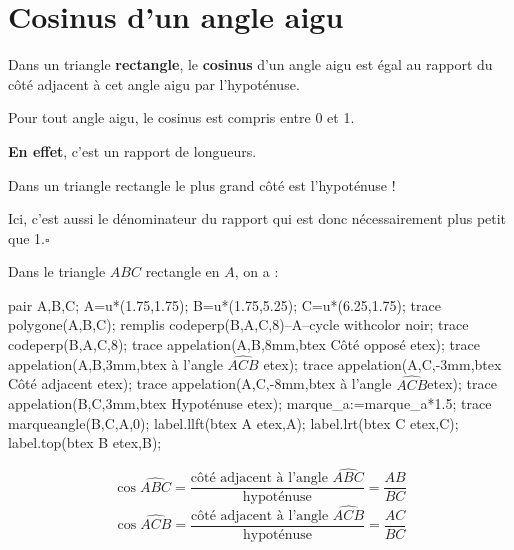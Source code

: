 \section{Cosinus d'un angle aigu}
\begin{definition}
    Dans un triangle {\bfseries rectangle}, le \textbf{cosinus} d'un angle aigu est égal au rapport du côté adjacent à cet angle aigu par l'hypoténuse.
\end{definition}

\begin{remarque}
    Pour tout angle aigu, le cosinus est compris entre 0 et 1.

    {\bfseries En effet}, c'est un rapport de longueurs.\par
    Dans un triangle rectangle le plus grand côté est l'hypoténuse !\par
    Ici, c'est aussi le dénominateur du rapport qui est donc nécessairement plus petit que 1.$\square$
\end{remarque}

\begin{exemples*1}
    Dans le triangle $ABC$ rectangle en $A$, on a : 
    
    \medskip
    \begin{minipage}{0.4\linewidth}
        \begin{Geometrie}[CoinHD={(7u,6u)}]            
            pair A,B,C;
            A=u*(1.75,1.75);
            B=u*(1.75,5.25);
            C=u*(6.25,1.75);
            trace polygone(A,B,C);
            remplis codeperp(B,A,C,8)--A--cycle withcolor noir;
            trace codeperp(B,A,C,8);
            trace appelation(A,B,8mm,btex Côté opposé etex);
            trace appelation(A,B,3mm,btex à l'angle $\widehat{ACB}$ etex);
            trace appelation(A,C,-3mm,btex Côté adjacent etex);
            trace appelation(A,C,-8mm,btex à l'angle $\widehat{ACB}$etex);
            trace appelation(B,C,3mm,btex Hypoténuse etex);
            marque_a:=marque_a*1.5;    
            trace marqueangle(B,C,A,0);
            label.llft(btex A etex,A);
            label.lrt(btex C etex,C);
            label.top(btex B etex,B);
        \end{Geometrie}
    \end{minipage}
    \begin{minipage}{0.55\linewidth}        
        $$\cos\widehat{ABC}=\frac{\mbox{côté adjacent à l'angle $\widehat{ABC}$}}{\mbox{hypoténuse}}=\frac{AB}{BC}$$
        $$\cos\widehat{ACB}=\frac{\mbox{côté adjacent à l'angle $\widehat{ACB}$}}{\mbox{hypoténuse}}=\frac{AC}{BC}$$
    \end{minipage}
\end{exemples*1}